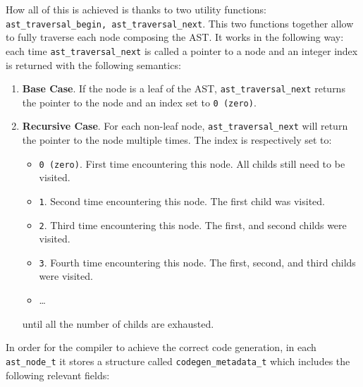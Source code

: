 \documentclass[a4paper]{article}
\begin{document}
How all of this is achieved is thanks to two utility functions: \texttt{ast\_traversal\_begin, ast\_traversal\_next}. This two functions together
allow to fully traverse each node composing the AST. It works in the following way: each time \texttt{ast\_traversal\_next} is called a pointer to a node
and an integer index is returned with the following semantics:

\begin{enumerate}
    \item \textbf{Base Case}. If the node is a leaf of the AST, \texttt{ast\_traversal\_next} returns the pointer to the node and an index set to \texttt{0 (zero)}.
    \item \textbf{Recursive Case}. For each non-leaf node, \texttt{ast\_traversal\_next} will return the pointer to the node multiple times. The index is respectively
        set to:
        \begin{itemize}
            \item \texttt{0 (zero)}. First time encountering this node. All childs still need to be visited.
            \item \texttt{1}. Second time encountering this node. The first child was visited.
            \item \texttt{2}. Third time encountering this node. The first, and second childs were visited.
            \item \texttt{3}. Fourth time encountering this node. The first, second, and third childs were visited.
            \item \dots
        \end{itemize}

        until all the number of childs are exhausted.

\end{enumerate}


In order for the compiler  to achieve the correct code generation, in each \texttt{ast\_node\_t} it stores a structure called \texttt{codegen\_metadata\_t}
which includes the following relevant fields:
\end{document}
